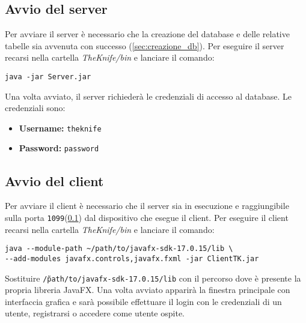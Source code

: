 \subsection{Avvio del server}
\label{sec:avvio_server}
Per avviare il server è necessario che la creazione del database 
e delle relative tabelle sia avvenuta con successo 
(\ref{sec:creazione_db}).
Per eseguire il server recarsi nella cartella \textit{TheKnife/bin} 
e lanciare il comando:
\begin{verbatim}
java -jar Server.jar
\end{verbatim}
Una volta avviato, il server richiederà le credenziali di accesso al database.
Le credenziali sono:
\begin{itemize}
    \item \textbf{Username:} \texttt{theknife}
    \item \textbf{Password:} \texttt{password}
\end{itemize}

\subsection{Avvio del client}
\label{sec:avvio_client}
Per avviare il client è necessario che il server sia in esecuzione
e raggiungibile sulla porta \texttt{1099}(\ref{sec:avvio_server}) dal dispositivo che 
esegue il client.
Per eseguire il client recarsi nella cartella \textit{TheKnife/bin} 
e lanciare il comando:
\begin{verbatim}
java --module-path ~/path/to/javafx-sdk-17.0.15/lib \
--add-modules javafx.controls,javafx.fxml -jar ClientTK.jar
\end{verbatim}
Sostituire \texttt{\~/path/to/javafx-sdk-17.0.15/lib} con 
il percorso dove è presente la propria libreria JavaFX.
Una volta avviato apparirà la finestra principale con interfaccia grafica
e sarà possibile effettuare il login con le credenziali di un utente, 
registrarsi o accedere come utente ospite.
